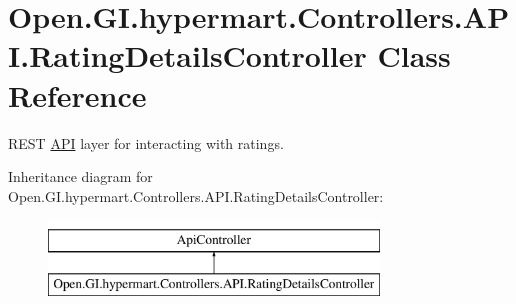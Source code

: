 \hypertarget{class_open_1_1_g_i_1_1hypermart_1_1_controllers_1_1_a_p_i_1_1_rating_details_controller}{}\section{Open.\+G\+I.\+hypermart.\+Controllers.\+A\+P\+I.\+Rating\+Details\+Controller Class Reference}
\label{class_open_1_1_g_i_1_1hypermart_1_1_controllers_1_1_a_p_i_1_1_rating_details_controller}


R\+E\+ST \hyperlink{namespace_open_1_1_g_i_1_1hypermart_1_1_controllers_1_1_a_p_i}{A\+PI} layer for interacting with ratings.  


Inheritance diagram for Open.\+G\+I.\+hypermart.\+Controllers.\+A\+P\+I.\+Rating\+Details\+Controller\+:\begin{figure}[H]
\begin{center}
\leavevmode
\includegraphics[height=2.000000cm]{class_open_1_1_g_i_1_1hypermart_1_1_controllers_1_1_a_p_i_1_1_rating_details_controller}
\end{center}
\end{figure}
